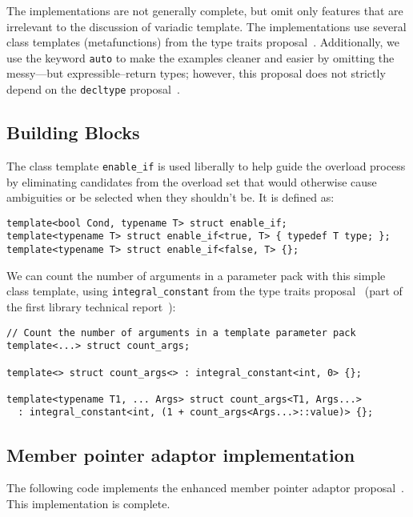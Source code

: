 \documentclass{article}
\begin{document}
The implementations are not generally complete, but omit only features
that are irrelevant to the discussion of variadic template. The
implementations use several class templates (metafunctions) from the
type traits proposal~\cite{Maddock03}. Additionally, we use the
keyword {\tt auto} to make the examples cleaner and easier by omitting
the messy---but expressible--return types; however, this proposal does
not strictly depend on the {\tt decltype} proposal~\cite{Jarvi03}.

\subsection{Building Blocks}
\label{building_blocks}
The class template {\tt enable\_if} is used liberally to help guide
the overload process by eliminating candidates from the overload set
that would otherwise cause ambiguities or be selected when they
shouldn't be. It is defined as:

\small
\begin{verbatim}
template<bool Cond, typename T> struct enable_if;
template<typename T> struct enable_if<true, T> { typedef T type; };
template<typename T> struct enable_if<false, T> {};
\end{verbatim}
\normalsize

We can count the number of arguments in a parameter pack with this
simple class template, using {\tt integral\_constant} from the type
traits proposal~\cite{Maddock03} (part of the first library technical
report~\cite{Austern03}):

\small
\begin{verbatim}
// Count the number of arguments in a template parameter pack
template<...> struct count_args;

template<> struct count_args<> : integral_constant<int, 0> {};

template<typename T1, ... Args> struct count_args<T1, Args...>
  : integral_constant<int, (1 + count_args<Args...>::value)> {};
\end{verbatim}
\normalsize

\subsection{Member pointer adaptor implementation}
\label{mem_fnimpl}
The following code implements the enhanced member pointer adaptor
proposal~\cite{Dimov03a}. This implementation is complete.
\end{document}
